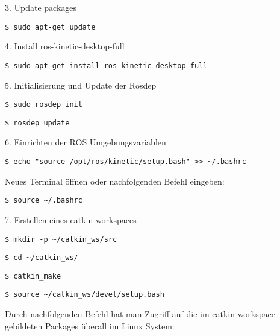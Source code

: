 3. Update packages

\begin{lstlisting}
$ sudo apt-get update
\end{lstlisting}

4. Install ros-kinetic-desktop-full


\begin{lstlisting}
$ sudo apt-get install ros-kinetic-desktop-full
\end{lstlisting}

5. Initialisierung und Update der Rosdep

\begin{lstlisting}
$ sudo rosdep init
\end{lstlisting}

\begin{lstlisting}
$ rosdep update
\end{lstlisting}

6. Einrichten der ROS Umgebungsvariablen

\begin{lstlisting}
$ echo "source /opt/ros/kinetic/setup.bash" >> ~/.bashrc
\end{lstlisting}

Neues Terminal öffnen oder nachfolgenden Befehl eingeben:

\begin{lstlisting}
$ source ~/.bashrc
\end{lstlisting}

7. Erstellen eines catkin workspaces 

\begin{lstlisting}
$ mkdir -p ~/catkin_ws/src
\end{lstlisting}

\begin{lstlisting}
$ cd ~/catkin_ws/
\end{lstlisting}

\begin{lstlisting}
$ catkin_make
\end{lstlisting}

\begin{lstlisting}
$ source ~/catkin_ws/devel/setup.bash
\end{lstlisting}

Durch nachfolgenden Befehl hat man Zugriff auf die im catkin workspace gebildeten Packages überall im Linux System: 


